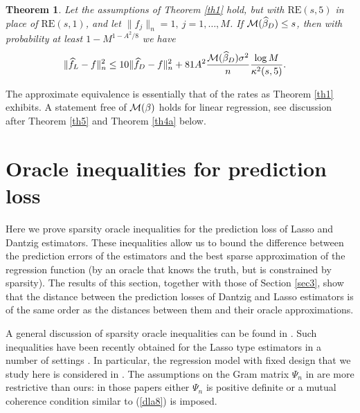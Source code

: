 \documentclass[dvips,aos]{imsart}
\numberwithin{equation}{section}
\theoremstyle{plain}
\newtheorem{thm}{Theorem}[section]%
\def\wideth{\widehat}
\def\scm{{\cal M}}
\def\wh{\widehat}
\def\RE#1#2{$\text{RE}(#1,#2)$}
\begin{document}
\begin{thm}\label{th2}
Let the assumptions of Theorem \ref{th1} hold, but with \RE s5 in
place of \RE s1, and let $\|f_j\|_n=1,\ j=1,\ldots,M$. If
$\scm(\wh\beta_D)\le s$, then with probability at least
$1-M^{1-A^2/8}$ we have
\begin{equation}\begin{split} &\| \wideth f_L -f\|_n^2 \le 10\| \wideth{f}_D -f \|_n^2 +
 81A^2  \frac{\scm(\wh\beta_D)
 \sigma^2}{n}\frac{\log M}{\kappa^2(s,5)}.
\end{split}\end{equation}
\end{thm}





 The approximate equivalence is essentially
that of the rates as Theorem \ref{th1} exhibits. A statement free of
$\scm(\beta)$ holds for linear regression, see discussion after
Theorem \ref{th5} and Theorem \ref{th4a} below.



\section{Oracle inequalities for prediction loss}
\label{sec5}

Here we prove sparsity oracle inequalities for the prediction loss
of Lasso and Dantzig estimators. These inequalities allow us to
bound the difference between the prediction errors of the estimators
and the best sparse approximation of the regression function (by an
oracle that knows the truth, but is constrained by sparsity). The
results of this section, together with those of Section \ref{sec3},
show that the distance between the prediction losses of Dantzig and
Lasso estimators is of the same order as the distances between them
and their oracle approximations.

A general discussion of sparsity oracle inequalities can be found in \cite{t06}. Such inequalities
have been recently obtained for the Lasso type estimators in a
number of settings
\cite{btw04,btw06a,btw07,btw06b,btw07a,k06,vdg06}. In particular,
the regression model with fixed design that we study here is
considered in \cite{btw04,btw06a,btw07}. The assumptions on the Gram
matrix $\Psi_n$ in \cite{btw04,btw06a,btw07} are more restrictive
than ours: in those papers either $\Psi_n$ is positive definite or a
mutual coherence condition similar to (\ref{dla8}) is imposed.
\end{document}
